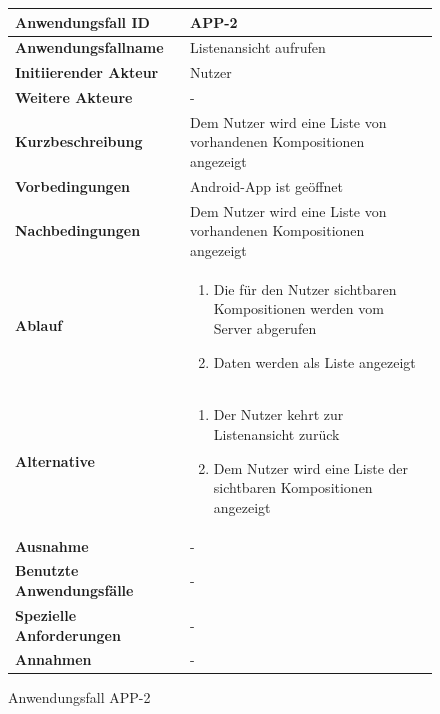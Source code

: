 \begin{figure}[h]
	\centering
	\begin{tabularx}{\textwidth}{ X | X }
		\textbf{Anwendungsfall ID} & APP-2 \\ \hline
		\textbf{Anwendungsfallname} & Listenansicht aufrufen \\ \hline
		\textbf{Initiierender Akteur} & Nutzer \\ \hline
		\textbf{Weitere Akteure} & -  \\ \hline
		\textbf{Kurzbeschreibung} & Dem Nutzer wird eine Liste von vorhandenen Kompositionen angezeigt \\ \hline
		\textbf{Vorbedingungen} & Android-App ist geöffnet  \\ \hline
		\textbf{Nachbedingungen} & Dem Nutzer wird eine Liste von vorhandenen Kompositionen angezeigt  \\ \hline
		\textbf{Ablauf} &
		\begin{enumerate}
			\item Die für den Nutzer sichtbaren Kompositionen werden vom Server abgerufen
			\item Daten werden als Liste angezeigt
		\end{enumerate} \\ \hline
		\textbf{Alternative} &
		\begin{enumerate}
			\item Der Nutzer kehrt zur Listenansicht zurück
			\item Dem Nutzer wird eine Liste der sichtbaren Kompositionen angezeigt
		\end{enumerate}  \\ \hline
		\textbf{Ausnahme} &
		-  \\ \hline
		\textbf{Benutzte Anwendungsfälle} & - \\ \hline
		\textbf{Spezielle Anforderungen} & - \\ \hline
		\textbf{Annahmen} & -
	\end{tabularx}
	\caption{Anwendungsfall APP-2}
	\label{fig:anwendungsfall-app-tabelle-APP-2}
\end{figure}

\newpage

